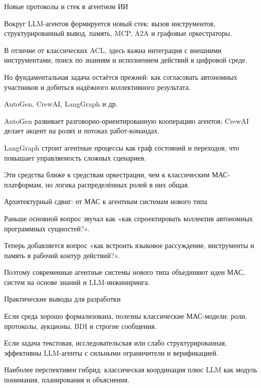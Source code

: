 \begin{frame}{Новые протоколы и стек в агентном ИИ}
	\topline
	\justifying
	\begin{textitemize}
		\item Вокруг LLM-агентов формируется новый стек: вызов инструментов, структурированный вывод, память, MCP, A2A и графовые оркестраторы.
		\item В отличие от классических ACL, здесь важна интеграция с внешними инструментами, поиск по знаниям и исполнением действий в цифровой среде.
		\item Но фундаментальная задача остаётся прежней: как согласовать автономных участников и добиться надёжного коллективного результата.
	\end{textitemize}
\end{frame}

\begin{frame}{AutoGen, CrewAI, LangGraph и др.}
	\topline
	\justifying
	\begin{textitemize}
		\item AutoGen развивает разговорно-ориентированную кооперацию агентов; CrewAI делает акцент на ролях и потоках работ-командах.
		\item LangGraph строит агентные процессы как граф состояний и переходов, что повышает управляемость сложных сценариев.
		\item Эти средства ближе к средствам оркестрации, чем к классическим МАС-платформам, но логика распределённых ролей в них общая.
	\end{textitemize}
\end{frame}

\begin{frame}{Архитектурный сдвиг: от МАС к агентным системам нового типа}
	\topline
	\justifying
	\begin{textitemize}
		\item Раньше основной вопрос звучал как «как спроектировать коллектив автономных программных сущностей?».
		\item Теперь добавляется вопрос «как встроить языковое рассуждение, инструменты и память в рабочий контур действий?».
		\item Поэтому современные агентные системы нового типа объединяют идеи МАС, систем на основе знаний и LLM-инжиниринга.
	\end{textitemize}
\end{frame}

\begin{frame}{Практические выводы для разработки}
	\topline
	\justifying
	\begin{textitemize}
		\item Если среда хорошо формализована, полезны классические МАС-модели: роли, протоколы, аукционы, BDI и строгие сообщения.
		\item Если задача текстовая, исследовательская или слабо структурированная, эффективны LLM-агенты с сильными ограничители и верификацией.
		\item Наиболее перспективен гибрид: классическая координация плюс LLM как модуль понимания, планирования и объяснения.
	\end{textitemize}
\end{frame}

